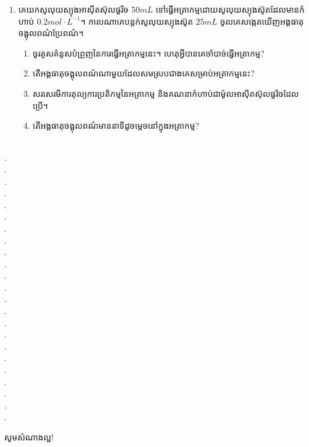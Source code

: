 \documentclass{officialexam}
\begin{document}
\begin{enumerate}[I]
\begin{enumerate}[k]
	\end{enumerate}
	\item គេយកសូលុយស្យុងអាសុីតស៊ុលផួរិច $50mL$ ទៅធ្វើអត្រាកម្មដោយសូលុយស្យុងស៊ូតដែលមានកំហាប់ $0.2mol\cdot L^{-1}$។ កាលណាគេបន្តក់សូលុយស្យុងស៊ូត $25mL$ ចូលគេសង្កេតឃើញអង្គធាតុចង្អុលពណ៌ប្រែពណ៌។
	\begin{enumerate}[k]
		\item ចូរគូសគំនូសបំព្រួញនៃការធ្វើអត្រាកម្មនេះ។ ហេតុអ្វីបានគេចាំបាច់ធ្វើអត្រាកម្ម?
		\item តើអង្គធាតុចង្អុលពណ៌ណាមួយដែលសមស្របជាងគេសម្រាប់អត្រាកម្មនេះ?
		\item សរសេរមីការតុល្យការប្រតិកម្មនៃអត្រាកម្ម និងគណនាកំហាប់ជាម៉ូលអាសុីតស៊ុលផួរិចដែលប្រើ។
		\item តើអង្គធាតុចង្អុលពណ៌មាននាទីដូចម្តេចនៅក្នុងអត្រាកម្ម?
	\end{enumerate}
\end{enumerate}
\\
{\color{white}.}\dotfill\\
{\color{white}.}\dotfill\\
{\color{white}.}\dotfill
\\
{\color{white}.}\dotfill\\
{\color{white}.}\dotfill\\
{\color{white}.}\dotfill
\\
{\color{white}.}\dotfill\\
{\color{white}.}\dotfill\\
{\color{white}.}\dotfill
\\
{\color{white}.}\dotfill\\
{\color{white}.}\dotfill\\
{\color{white}.}\dotfill
\\
{\color{white}.}\dotfill\\
{\color{white}.}\dotfill\\
{\color{white}.}\dotfill
\\
{\color{white}.}\dotfill\\
{\color{white}.}\dotfill\\
{\color{white}.}\dotfill
\\
{\color{white}.}\dotfill\\
{\color{white}.}\dotfill\\
{\color{white}.}\dotfill
\\
{\color{white}.}\dotfill\\
{\color{white}.}\dotfill\\
\begin{center}
	\sffamily\color{blue}
	សូមសំណាងល្អ!
\end{center}\newpage
\end{document}
